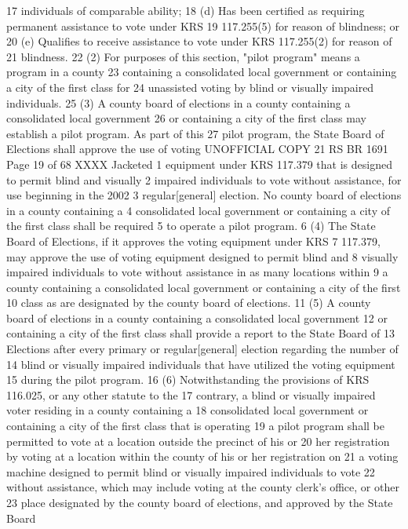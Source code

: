 17 individuals of comparable ability;
18 (d) Has been certified as requiring permanent assistance to vote under KRS
19 117.255(5) for reason of blindness; or
20 (e) Qualifies to receive assistance to vote under KRS 117.255(2) for reason of
21 blindness.
22 (2) For purposes of this section, "pilot program" means a program in a county
23 containing a consolidated local government or containing a city of the first class for
24 unassisted voting by blind or visually impaired individuals.
25 (3) A county board of elections in a county containing a consolidated local government
26 or containing a city of the first class may establish a pilot program. As part of this
27 pilot program, the State Board of Elections shall approve the use of voting 
UNOFFICIAL COPY 21 RS BR 1691
Page 19 of 68
XXXX Jacketed
1 equipment under KRS 117.379 that is designed to permit blind and visually
2 impaired individuals to vote without assistance, for use beginning in the 2002
3 regular[general] election. No county board of elections in a county containing a
4 consolidated local government or containing a city of the first class shall be required
5 to operate a pilot program.
6 (4) The State Board of Elections, if it approves the voting equipment under KRS
7 117.379, may approve the use of voting equipment designed to permit blind and
8 visually impaired individuals to vote without assistance in as many locations within
9 a county containing a consolidated local government or containing a city of the first
10 class as are designated by the county board of elections.
11 (5) A county board of elections in a county containing a consolidated local government
12 or containing a city of the first class shall provide a report to the State Board of
13 Elections after every primary or regular[general] election regarding the number of
14 blind or visually impaired individuals that have utilized the voting equipment
15 during the pilot program.
16 (6) Notwithstanding the provisions of KRS 116.025, or any other statute to the
17 contrary, a blind or visually impaired voter residing in a county containing a
18 consolidated local government or containing a city of the first class that is operating
19 a pilot program shall be permitted to vote at a location outside the precinct of his or
20 her registration by voting at a location within the county of his or her registration on
21 a voting machine designed to permit blind or visually impaired individuals to vote
22 without assistance, which may include voting at the county clerk's office, or other
23 place designated by the county board of elections, and approved by the State Board
